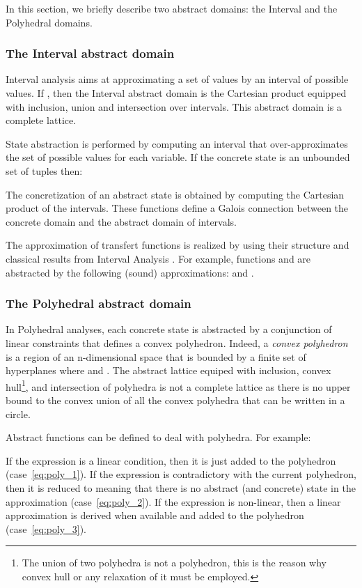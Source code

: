 \documentclass[submission,copyright,creativecommons]{eptcs}
\begin{document}
In this section, we briefly describe two abstract domains:
the Interval \cite{CC76} and the Polyhedral \cite{CH78} domains. 

\subsubsection{The Interval abstract domain}
\label{intervals}
Interval analysis aims at approximating a set of values by an interval of possible values.
If , then the Interval abstract domain is the Cartesian product 
 equipped with
inclusion, union and intersection over intervals. This abstract domain is a complete lattice.

\noindent
State abstraction is performed by computing an interval that over-approximates the set of possible
values for each variable. If the concrete state is an unbounded set of tuples
 then:

The concretization of an abstract state is obtained by computing the Cartesian product of the intervals.
These functions define a Galois connection between the concrete domain and the abstract domain of intervals.

\noindent
The approximation of transfert functions is realized by using their structure and classical results from Interval Analysis \cite{Moo66}.
For example, functions  and  are abstracted by the following (sound) approximations:
 and 
.    

\subsubsection{The Polyhedral abstract domain}
\label{polyhedra}

In Polyhedral analyses, each concrete state is abstracted by a conjunction of linear
constraints that defines a convex polyhedron. Indeed, a {\it convex polyhedron} is a region of an
n-dimensional space that is bounded by a finite set of hyperplanes  where  and .
 The abstract lattice equiped with
inclusion, convex hull\footnote{The union of two polyhedra is not a polyhedron, this is the reason why convex hull or any relaxation of it
must be employed.}, and intersection of polyhedra is not a complete lattice as there is no 
upper bound to the convex union of all the convex polyhedra that can be written in a circle.    

\noindent
Abstract functions can be defined to deal with polyhedra. For example:

\noindent 
If the expression is a linear condition, then it is just added to the polyhedron (case~\ref{eq:poly_1}). 
If the expression is contradictory with the current polyhedron, then it is reduced to  meaning that
there is no abstract (and concrete) state in the approximation (case~\ref{eq:poly_2}). 
If the expression is non-linear, then a linear approximation is derived when available
and added to the polyhedron (case~\ref{eq:poly_3}). 
\end{document}
